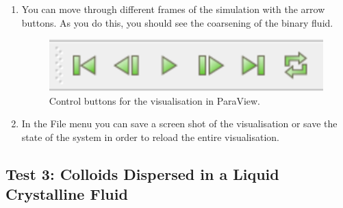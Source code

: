 \documentclass[11pt,twoside,a4paper]{article}
\begin{document}
\begin{enumerate}
\begin{enumerate}
\item You can move through different frames of the simulation with the arrow buttons.
As you do this, you should see the coarsening of the binary fluid.

\begin{figure}[H]
\begin{center}
\includegraphics[width=0.4\linewidth]{arrows.png}
  \caption{Control buttons for the visualisation in ParaView.}
  \label{fig:changeFrame}
  \end{center}
\end{figure}


\item In the File menu you can save a screen shot of the visualisation or save the state of the system in order to reload the entire visualisation.
\end{enumerate}
\end{enumerate} 

\subsection{Test 3: Colloids Dispersed in a Liquid Crystalline Fluid}
\end{document}
